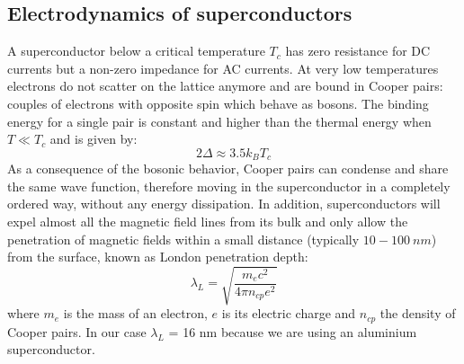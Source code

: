 \documentclass[12pt]{article}
\begin{document}
\subsection{Electrodynamics of superconductors}
A superconductor below a critical temperature $T_c$ has zero resistance for DC currents but a non-zero impedance for AC currents. At very low temperatures electrons do not scatter on the lattice anymore and are bound in Cooper pairs: couples of electrons with opposite spin which behave as bosons.
The binding energy for a single pair is constant and higher than the thermal energy when  $T \ll T_c$ and is given by:
\begin{equation}
    2\Delta\approx3.5 k_B T_c
\end{equation}
As a consequence of the bosonic behavior, Cooper pairs can condense and share the same wave function, therefore moving in the superconductor in a completely ordered way, without any energy dissipation. In addition, superconductors will expel almost all the magnetic field lines from its bulk and only allow the penetration of magnetic fields within a small distance (typically $10-100 ~nm$) from the surface, known as London penetration depth:
\begin{equation}
    \lambda_{L} = \sqrt{\frac{m_e c^2}{4 \pi n_{cp} e^2}}
\end{equation}
where $m_e$ is the mass of an electron, $e$ is its electric charge and $n_{cp}$ the density of Cooper pairs. In our case $\lambda_L$ = 16 nm because we are using an aluminium superconductor.
\end{document}
